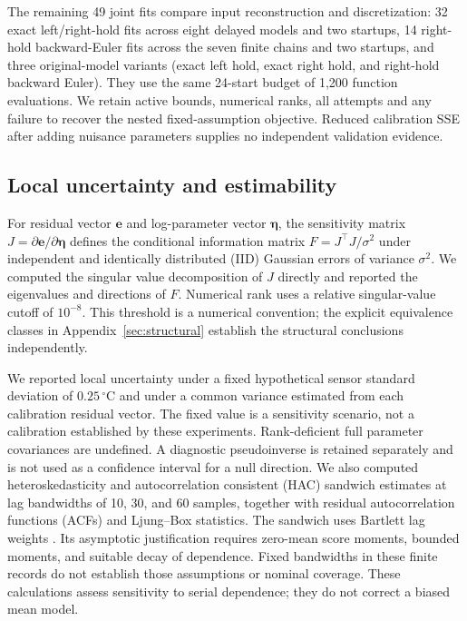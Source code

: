 The remaining 49 joint fits compare input reconstruction and discretization:
32 exact left/right-hold fits across eight delayed models and two startups,
14 right-hold backward-Euler fits across the seven finite chains and two
startups, and three original-model variants (exact left hold, exact right hold,
and right-hold backward Euler). They use the same 24-start budget of 1,200
function evaluations. We retain active bounds, numerical ranks, all attempts
and any failure to recover the nested fixed-assumption objective. Reduced
calibration SSE after adding nuisance parameters supplies no independent
validation evidence.

\subsection{Local uncertainty and estimability}
For residual vector $\bm e$ and log-parameter vector $\bm\eta$, the sensitivity
matrix $J=\partial\bm e/\partial\bm\eta$ defines the conditional information
matrix $F=J^\top J/\sigma^2$ under independent and identically distributed (IID)
Gaussian errors of variance
$\sigma^2$. We computed the singular value decomposition of $J$ directly and
reported the eigenvalues and directions of $F$. Numerical rank uses a relative
singular-value cutoff of $10^{-8}$. This threshold is a numerical convention;
the explicit equivalence classes in Appendix~\ref{sec:structural} establish the
structural conclusions independently.

We reported local uncertainty under a fixed hypothetical sensor standard
deviation of $0.25\,{}^\circ\mathrm C$ and under a common variance estimated
from each calibration residual vector. The fixed value is a sensitivity scenario,
not a calibration established by these experiments. Rank-deficient full parameter
covariances are undefined. A diagnostic pseudoinverse is retained separately and
is not used as a confidence interval for a null direction. We also computed
heteroskedasticity and autocorrelation consistent (HAC) sandwich estimates at lag
bandwidths of 10, 30, and 60 samples, together with residual autocorrelation
functions (ACFs) and Ljung--Box statistics. The sandwich uses Bartlett lag weights
\citep{newey-1987-simple}. Its asymptotic justification requires zero-mean score
moments, bounded moments, and suitable decay of dependence. Fixed bandwidths
in these finite records do not establish those assumptions or nominal coverage.
These calculations assess sensitivity to
serial dependence; they do not correct a biased mean model.

